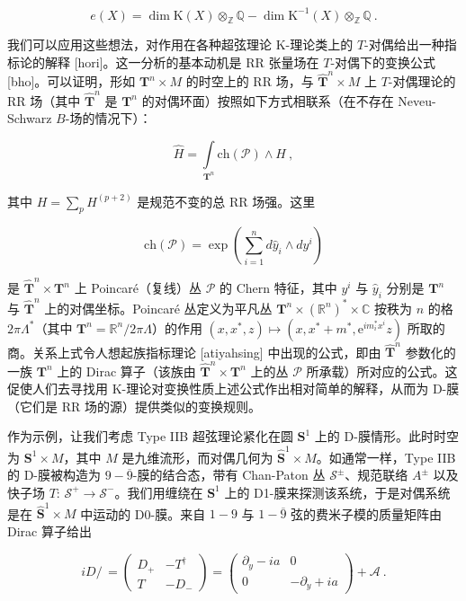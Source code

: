 \documentclass[11pt,a4paper]{ctexart}
\begin{document}
\[e(X)=\dim{\mathrm K}(X)\otimes_{\mathbb{Z}}{\mathbb{Q}}-\dim{\mathrm K}^{-1}(X)\otimes_{\mathbb{Z}}{\mathbb{Q}}\ .\]

我们可以应用这些想法，对作用在各种超弦理论 K-理论类上的 \(T\)-对偶给出一种指标论的解释 [hori]。这一分析的基本动机是 RR 张量场在 \(T\)-对偶下的变换公式 [bho]。可以证明，形如 \({\mathbf T}^n\times M\) 的时空上的 RR 场，与 \(\widehat{\mathbf T}^n\times M\) 上 \(T\)-对偶理论的 RR 场（其中 \(\widehat{\mathbf T}^n\) 是 \({\mathbf T}^n\) 的对偶环面）按照如下方式相联系（在不存在 Neveu-Schwarz \(B\)-场的情况下）：

\[\widehat{H}=\int\limits_{{\mathbf T}^n}\mathrm{ch}({\mathcal P})\wedge H\ ,\]

其中 \(H=\sum_pH^{(p+2)}\) 是规范不变的总 RR 场强。这里

\[\mathrm{ch}({\mathcal P})=\exp\left(\sum_{i=1}^nd\widehat{y}_i\wedge dy^i\right)\]

是 \(\widehat{\mathbf T}^n
\times{\mathbf T}^n\) 上 Poincaré（复线）丛 \(\mathcal P\) 的 Chern 特征，其中 \(y^i\) 与 \(\widehat{y}_i\) 分别是 \({\mathbf T}^n\) 与 \(\widehat{\mathbf T}^n\) 上的对偶坐标。Poincaré 丛定义为平凡丛 \({\mathbf T}^n\times({\mathbb{R}}^n)^*\times{\mathbb{C}}\) 按秩为 \(n\) 的格 \(2\pi\Lambda
^*\)（其中 \({\mathbf T}^n={\mathbb{R}}^n/2\pi\Lambda\)）的作用 \((x,x^*,z)\mapsto(x,x^*+m^*,\mbox{e}^{im_i^*
x^i}z)\) 所取的商。关系上式令人想起族指标理论 [atiyahsing] 中出现的公式，即由 \(\widehat{\mathbf T}^n\) 参数化的一族 \({\mathbf T}^n\) 上的 Dirac 算子（该族由 \(\widehat{\mathbf T}^n
\times{\mathbf T}^n\) 上的丛 \(\mathcal P\) 所承载）所对应的公式。这促使人们去寻找用 K-理论对变换性质上述公式作出相对简单的解释，从而为 D-膜（它们是 RR 场的源）提供类似的变换规则。

作为示例，让我们考虑 Type IIB 超弦理论紧化在圆 \({\mathbf S}^1\) 上的 D-膜情形。此时时空为 \({\mathbf S}^1\times M\)，其中 \(M\) 是九维流形，而对偶几何为 \(\widehat{\mathbf S}^1\times M\)。如通常一样，Type IIB 的 D-膜被构造为 \(9-\overline{9}\)-膜的结合态，带有 Chan-Paton 丛 \({\mathcal S}^\pm\)、规范联络 \(A^\pm\) 以及快子场 \(T:\,
{\mathcal S}^+\rightarrow{\mathcal S}^-\)。我们用缠绕在 \({\mathbf S}^1\) 上的 D1-膜来探测该系统，于是对偶系统是在 \(\widehat{\mathbf S}^1\times
M\) 中运动的 D0-膜。来自 \(1-9\) 与 \(1-\overline{9}\) 弦的费米子模的质量矩阵由 Dirac 算子给出

\[iD/\,=\left( \begin{array}{cc}D_+& -T^\dagger\\
T&-D_-\end{array}\right)=
\left( \begin{array}{cc}\partial_y-ia&0\\ 0&-\partial_y+ia
\end{array}\right)+{\mathcal A}\ .\]
\end{document}
